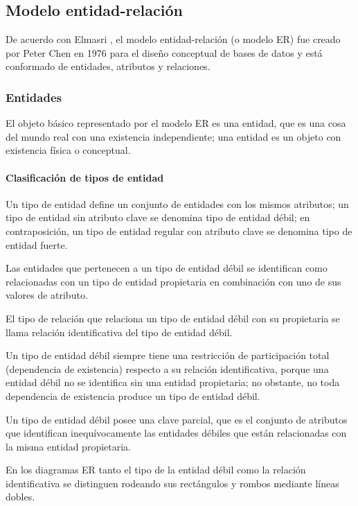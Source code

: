 
\subsection{Modelo entidad-relación}

De acuerdo con Elmasri \cite{ramez_elmasri_fundamentos_nodate}, el modelo entidad-relación (o modelo ER) fue creado por Peter Chen en 1976\cite{chen_entity-relationship_nodate} para el diseño conceptual de bases de datos y está conformado de entidades, atributos y relaciones. 

\subsubsection{Entidades}
El objeto básico representado por el modelo ER es una entidad, que es una cosa del mundo real con una existencia independiente; una entidad es un objeto con existencia física o conceptual.

\paragraph*{Clasificación de tipos de entidad}

Un tipo de entidad define un conjunto de entidades con los mismos atributos; un tipo de entidad sin atributo clave se denomina tipo de entidad débil; en contraposición, un tipo de entidad regular con atributo clave se denomina tipo de entidad fuerte.


Las entidades que pertenecen a un tipo de entidad débil se identifican como relacionadas con un tipo de entidad propietaria en combinación con uno de sus valores de atributo.


El tipo de relación que relaciona un tipo de entidad débil con su propietaria se llama relación identificativa del tipo de entidad débil. 


Un tipo de entidad débil siempre tiene una restricción de participación total (dependencia de existencia) respecto a su relación identificativa, porque una entidad débil no se identifica sin una entidad propietaria; no obstante, no toda dependencia de existencia produce un tipo de entidad débil.


Un tipo de entidad débil posee una clave parcial, que es el conjunto de atributos que identifican inequívocamente las entidades débiles que están relacionadas con la misma entidad propietaria. 


En los diagramas ER tanto el tipo de la entidad débil como la relación identificativa se distinguen rodeando sus rectángulos y rombos mediante líneas dobles.



